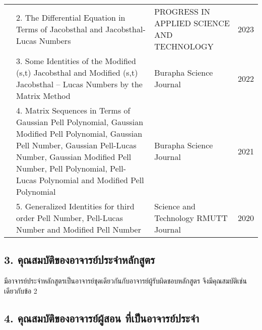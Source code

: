 {{\begin{center}
\begin{longtable}{|p{}|>{\raggedright}p{}|>{\raggedright}p{}|p{}|}
&2. The Differential Equation in Terms of Jacobsthal and Jacobsthal-Lucas Numbers
&PROGRESS IN APPLIED SCIENCE AND TECHNOLOGY
&2023 \\ \cline{2-4}

&3. Some Identities of the Modified (s,t) Jacobsthal and 
Modified (s,t) Jacobsthal – Lucas Numbers by the Matrix Method 
&Burapha Science Journal
&2022 \\  \cline{2-4}

&4. Matrix Sequences in Terms
of Gaussian Pell Polynomial,
Gaussian Modified Pell Polynomial,
Gaussian Pell Number, 
Gaussian Pell-Lucas Number,
Gaussian Modified Pell Number,
Pell Polynomial, Pell-Lucas Polynomial 
and Modified Pell Polynomial
&Burapha Science Journal
&2021 \\ \cline{2-4}

&5. Generalized Identities for 
third order Pell Number,
Pell-Lucas Number 
and Modified Pell Number
&Science and Technology RMUTT Journal
&2020 \\ \hline
\end{longtable}
\end{center}
\vspace{-1cm}
\printselfeval

\subsection*{3. คุณสมบัติของอาจารย์ประจำหลักสูตร}

\printprogram{}  มีอาจารย์ประจำหลักสูตรเป็นอาจารย์ชุดเดียวกันกับอาจารย์ผู้รับผิดชอบหลักสูตร จึงมีคุณสมบัติเช่นเดียวกับข้อ 2\\

\printselfeval

\subsection*{4. คุณสมบัติของอาจารย์ผู้สอน ที่เป็นอาจารย์ประจำ }

}}

